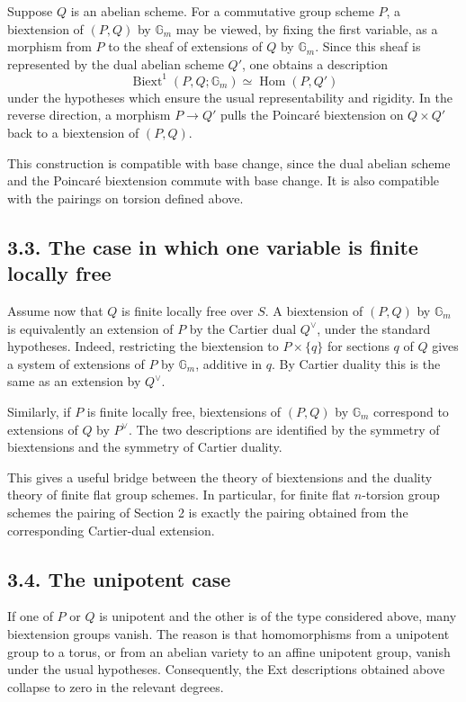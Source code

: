 \documentclass[11pt]{article}
\theoremstyle{plain}
\theoremstyle{definition}
\theoremstyle{remark}
\DeclareMathOperator{\Hom}{Hom}
\DeclareMathOperator{\Biext}{Biext}
\newcommand{\Gm}{\mathbb G_m}
\begin{document}
Suppose \(Q\) is an abelian scheme. For a commutative group scheme \(P\), a
biextension of \((P,Q)\) by \(\Gm\) may be viewed, by fixing the first variable,
as a morphism from \(P\) to the sheaf of extensions of \(Q\) by \(\Gm\). Since
this sheaf is represented by the dual abelian scheme \(Q'\), one obtains a
description
\[
\Biext^1(P,Q;\Gm)\simeq \Hom(P,Q')
\]
under the hypotheses which ensure the usual representability and rigidity. In
the reverse direction, a morphism \(P\to Q'\) pulls the Poincaré biextension on
\(Q\times Q'\) back to a biextension of \((P,Q)\).

This construction is compatible with base change, since the dual abelian scheme
and the Poincaré biextension commute with base change. It is also compatible with
the pairings on torsion defined above.

\subsection*{3.3. The case in which one variable is finite locally free}

Assume now that \(Q\) is finite locally free over \(S\). A biextension of
\((P,Q)\) by \(\Gm\) is equivalently an extension of \(P\) by the Cartier dual
\(Q^\vee\), under the standard hypotheses. Indeed, restricting the biextension to
\(P\times \{q\}\) for sections \(q\) of \(Q\) gives a system of extensions of
\(P\) by \(\Gm\), additive in \(q\). By Cartier duality this is the same as an
extension by \(Q^\vee\).

Similarly, if \(P\) is finite locally free, biextensions of \((P,Q)\) by
\(\Gm\) correspond to extensions of \(Q\) by \(P^\vee\). The two descriptions are
identified by the symmetry of biextensions and the symmetry of Cartier duality.

This gives a useful bridge between the theory of biextensions and the duality
theory of finite flat group schemes. In particular, for finite flat
\(n\)-torsion group schemes the pairing of Section 2 is exactly the pairing
obtained from the corresponding Cartier-dual extension.

\subsection*{3.4. The unipotent case}

If one of \(P\) or \(Q\) is unipotent and the other is of the type considered
above, many biextension groups vanish. The reason is that homomorphisms from a
unipotent group to a torus, or from an abelian variety to an affine unipotent
group, vanish under the usual hypotheses. Consequently, the Ext descriptions
obtained above collapse to zero in the relevant degrees.
\end{document}
